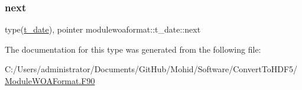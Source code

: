 \mbox{\label{structmodulewoaformat_1_1t__date_a4870285407e8ab1715ffed42d685075d}} 
\subsubsection{\texorpdfstring{next}{next}}
{\footnotesize\ttfamily type(\mbox{\hyperlink{structmodulewoaformat_1_1t__date}{t\+\_\+date}}), pointer modulewoaformat\+::t\+\_\+date\+::next\hspace{0.3cm}{\ttfamily [private]}}



The documentation for this type was generated from the following file\+:\begin{DoxyCompactItemize}
\item 
C\+:/\+Users/administrator/\+Documents/\+Git\+Hub/\+Mohid/\+Software/\+Convert\+To\+H\+D\+F5/\mbox{\hyperlink{_module_w_o_a_format_8_f90}{Module\+W\+O\+A\+Format.\+F90}}\end{DoxyCompactItemize}
